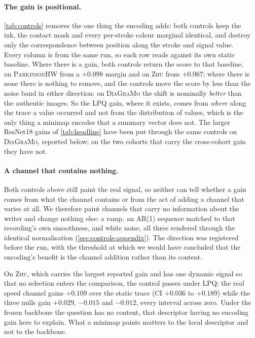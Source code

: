 \documentclass[10pt,a4paper]{article}
\begin{document}
\paragraph{The gain is positional.} \cref{tab:controls} removes the one thing the encoding adds:
both controls keep the ink, the contact mask and every per-stroke colour marginal identical, and
destroy only the correspondence between position along the stroke and signal value. Every column is
from the same run, so each row reads against its own static baseline. Where there is a gain, both
controls return the score to that baseline, on \textsc{ParkinsonHW} from a $+0.098$ margin and on
\textsc{Zhu} from $+0.067$; where there is none there is nothing to remove, and the controls move
the score by less than the noise band in either direction: on \textsc{DiaGraMo} the shift is
nominally \emph{better} than the authentic images. So the LPQ gain,
where it exists, comes from \emph{where} along the trace a value occurred and not from the
distribution of values, which is the only thing a minimap encodes that a summary vector does not.
The larger ResNet18 gains of \cref{tab:headline} have been put through the same controls on
\textsc{DiaGraMo}, reported below; on the two cohorts that carry the cross-cohort gain they have
not.

\paragraph{A channel that contains nothing.} Both controls above still paint the real signal, so
neither can tell whether a gain comes from what the channel contains or from the act of adding a
channel that varies at all. We therefore
paint channels that carry no information about the writer and change nothing else: a ramp, an AR(1)
sequence matched to that recording's own smoothness, and white noise, all three rendered through the
identical normalisation (\cref{sec:controls-appendix}). The direction was registered before the run,
with the threshold at which we would have concluded that the encoding's benefit is the channel
addition rather than its content.

On \textsc{Zhu}, which carries the largest reported gain and has one dynamic signal so that no
selection enters the comparison, the control passes under LPQ: the real speed channel gains $+0.109$
over the static trace (CI $+0.036$ to $+0.189$) while the three nulls gain $+0.029$, $-0.015$ and
$-0.012$, every interval across zero. Under the frozen backbone the question has no content, that
descriptor having no encoding gain here to explain. What a minimap paints matters to the local
descriptor and not to the backbone.
\end{document}
